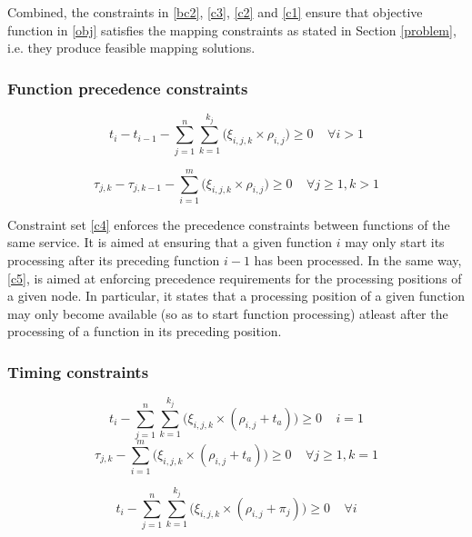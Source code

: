 \documentclass[conference]{IEEEtran}
\begin{document}
Combined, the constraints in \eqref{bc2}, \eqref{c3}, \eqref{c2} and \eqref{c1} ensure that objective function in \eqref{obj} satisfies the mapping constraints as stated in Section \ref{problem}, i.e. they produce feasible mapping solutions.

\subsubsection{Function precedence constraints}
\begin{equation}
t_{i} - t_{i-1} - \sum\limits_{j=1}^{n} \sum\limits_{k=1}^{k_j}  \Big(\xi_{i,j,k} \times \rho_{i,j}\Big) \geq 0 \ \ \ \ \   \forall i>1
\label{c4}
\end{equation}

\begin{equation}
\tau_{j,k} - \tau_{j,k-1} - \sum\limits_{i=1}^{m}  \Big(\xi_{i,j,k} \times \rho_{i,j}\Big) \geq 0\ \ \ \ \   \forall j\geq1, k>1
\label{c5}
\end{equation}

Constraint set \eqref{c4} enforces the precedence constraints between functions of the same service. It is aimed at ensuring that a given function $i$ may only start its processing after its preceding function $i-1$ has been processed. In the same way,  \eqref{c5}, is aimed at enforcing precedence requirements for the processing positions of a given node. In particular, it states that a processing position of a given function may only become available (so as to start function processing) atleast after the processing of a function in its preceding position.

\subsubsection{Timing constraints}



\begin{equation}
 t_{i} - \sum\limits_{j=1}^{n} \sum\limits_{k=1}^{k_j}  \Big(\xi_{i,j,k} \times (\rho_{i,j}+t_a)\Big) \geq 0 \ \ \ \ \ i = 1
\label{c16}
\end{equation}
\begin{equation}
\tau_{j,k} - \sum\limits_{i=1}^{m}  \Big(\xi_{i,j,k} \times (\rho_{i,j}+ t_a)\Big) \geq 0 \ \ \ \ \ \forall j\geq1, k = 1
\label{c17}
\end{equation}

\begin{equation}
 t_{i} - \sum\limits_{j=1}^{n} \sum\limits_{k=1}^{k_j}  \Big(\xi_{i,j,k} \times (\rho_{i,j}+\pi_j)\Big) \geq 0 \ \ \ \ \ \forall i
\label{comp1}
\end{equation}
\end{document}
